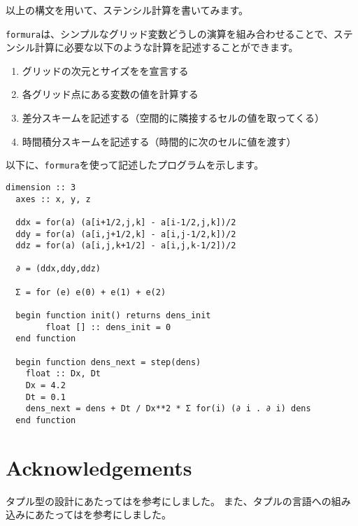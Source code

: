 \documentclass{jsarticle}
\newcommand{\formura}{{\texttt{formura}}}
\begin{document}
以上の構文を用いて、ステンシル計算を書いてみます。


\formura は、シンプルなグリッド変数どうしの演算を組み合わせることで、ステンシル計算に必要な以下のような計算を記述することができます。

\begin{enumerate}
\item グリッドの次元とサイズをを宣言する
\item 各グリッド点にある変数の値を計算する
\item 差分スキームを記述する（空間的に隣接するセルの値を取ってくる）
\item 時間積分スキームを記述する（時間的に次のセルに値を渡す）
\end{enumerate}


以下に、\formura を使って記述したプログラムを示します。

\begin{lstlisting}[mathescape]
  dimension :: 3
  axes :: x, y, z

  ddx = for(a) (a[i+1/2,j,k] - a[i-1/2,j,k])/2
  ddy = for(a) (a[i,j+1/2,k] - a[i,j-1/2,k])/2
  ddz = for(a) (a[i,j,k+1/2] - a[i,j,k-1/2])/2

  ∂ = (ddx,ddy,ddz)

  Σ = for (e) e(0) + e(1) + e(2)

  begin function init() returns dens_init
        float [] :: dens_init = 0
  end function

  begin function dens_next = step(dens)
    float :: Dx, Dt
    Dx = 4.2
    Dt = 0.1
    dens_next = dens + Dt / Dx**2 * Σ for(i) (∂ i . ∂ i) dens
  end function
\end{lstlisting}

\newpage

\section*{Acknowledgements}

タプル型の設計にあたっては\citet{pierce2002types}を参考にしました。
また、タプルの言語への組み込みにあたっては\citet{oliveira2015modular}を参考にしました。





\end{document}

